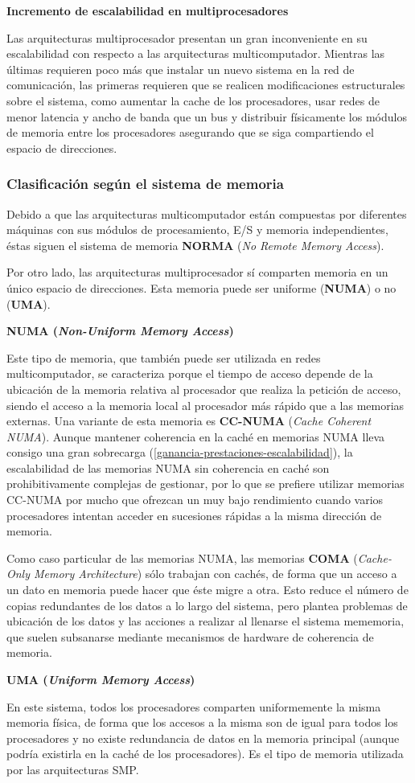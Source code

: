 \textbf{Incremento de escalabilidad en multiprocesadores}

Las arquitecturas multiprocesador presentan un gran inconveniente en su escalabilidad con respecto a las arquitecturas multicomputador.
Mientras las últimas requieren poco más que instalar un nuevo sistema en la red de comunicación, las primeras requieren que se realicen modificaciones estructurales sobre el sistema, como aumentar la cache de los procesadores, usar redes de menor latencia y ancho de banda que un bus y distribuir físicamente los módulos de memoria entre los procesadores asegurando que se siga compartiendo el espacio de direcciones.

\subsubsection{Clasificación según el sistema de memoria}

Debido a que las arquitecturas multicomputador están compuestas por diferentes máquinas con sus módulos de procesamiento, E/S y memoria independientes, éstas siguen el sistema de memoria \textbf{NORMA} (\textit{No Remote Memory Access}).

Por otro lado, las arquitecturas multiprocesador sí comparten memoria en un único espacio de direcciones.
Esta memoria puede ser uniforme (\textbf{NUMA}) o no (\textbf{UMA}).

\textbf{NUMA (\textit{Non-Uniform Memory Access})}

Este tipo de memoria, que también puede ser utilizada en redes multicomputador, se caracteriza porque el tiempo de acceso depende de la ubicación de la memoria relativa al procesador que realiza la petición de acceso, siendo el acceso a la memoria local al procesador más rápido que a las memorias externas.
Una variante de esta memoria es \textbf{CC-NUMA} (\textit{Cache Coherent NUMA}).
Aunque mantener coherencia en la caché en memorias NUMA lleva consigo una gran sobrecarga (\ref{ganancia-prestaciones-escalabilidad}), la escalabilidad de las memorias NUMA sin coherencia en caché son prohibitivamente complejas de gestionar, por lo que se prefiere utilizar memorias CC-NUMA por mucho que ofrezcan un muy bajo rendimiento cuando varios procesadores intentan acceder en sucesiones rápidas a la misma dirección de memoria.

Como caso particular de las memorias NUMA, las memorias \textbf{COMA} (\textit{Cache-Only Memory Architecture}) sólo trabajan con cachés, de forma que un acceso a un dato en memoria puede hacer que éste migre a otra.
Esto reduce el número de copias redundantes de los datos a lo largo del sistema, pero plantea problemas de ubicación de los datos y las acciones a realizar al llenarse el sistema mememoria, que suelen subsanarse mediante mecanismos de hardware de coherencia de memoria.

\textbf{UMA (\textit{Uniform Memory Access})}

En este sistema, todos los procesadores comparten uniformemente la misma memoria física, de forma que los accesos a la misma son de igual para todos los procesadores y no existe redundancia de datos en la memoria principal (aunque podría existirla en la caché de los procesadores).
Es el tipo de memoria utilizada por las arquitecturas SMP\@.
